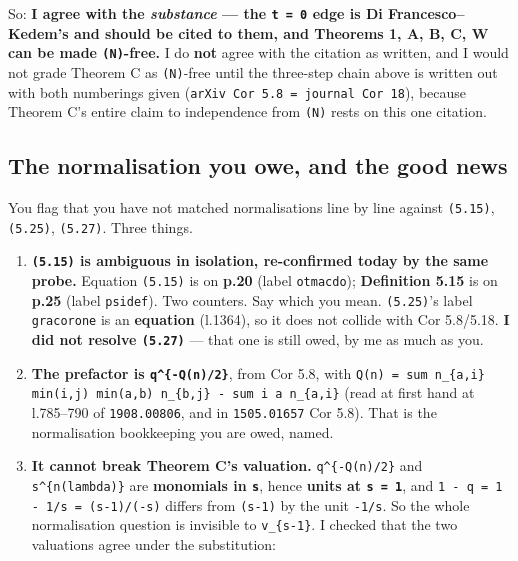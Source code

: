 \documentclass[11pt,a4paper]{article}
\begin{document}
So: \textbf{I agree with the \emph{substance} --- the \mbox{\texttt{t = 0}} edge is Di Francesco--Kedem's and should be cited to them, and Theorems 1, A, B, C, W can be made \mbox{\texttt{(N)}}-free.} I do \textbf{not} agree with the citation as written, and I would not grade Theorem C as \mbox{\texttt{(N)}}-free until the three-step chain above is written out with both numberings given (\mbox{\texttt{arXiv Cor 5.8 = journal Cor 18}}), because Theorem C's entire claim to independence from \mbox{\texttt{(N)}} rests on this one citation.

\subsection*{The normalisation you owe, and the good news}

You flag that you have not matched normalisations line by line against \mbox{\texttt{(5.15)}}, \mbox{\texttt{(5.25)}}, \mbox{\texttt{(5.27)}}. Three things.

\begin{enumerate}
\item \textbf{\mbox{\texttt{(5.15)}} is ambiguous in isolation, re-confirmed today by the same probe.} Equation \mbox{\texttt{(5.15)}} is on \textbf{p.20} (label \mbox{\texttt{otmacdo}}); \textbf{Definition 5.15} is on \textbf{p.25} (label \mbox{\texttt{psidef}}). Two counters. Say which you mean. \mbox{\texttt{(5.25)}}'s label \mbox{\texttt{gracorone}} is an \textbf{equation} (l.1364), so it does not collide with Cor 5.8/5.18. \textbf{I did not resolve \mbox{\texttt{(5.27)}}} --- that one is still owed, by me as much as you.
\item \textbf{The prefactor is \mbox{\texttt{q\textasciicircum{}\{-Q(n)/2\}}}}, from Cor 5.8, with \mbox{\texttt{Q(n) = sum n\_\{a,i\} min(i,j) min(a,b) n\_\{b,j\} - sum i a n\_\{a,i\}}} (read at first hand at l.785--790 of \mbox{\texttt{1908.00806}}, and in \mbox{\texttt{1505.01657}} Cor 5.8). That is the normalisation bookkeeping you are owed, named.
\item \textbf{It cannot break Theorem C's valuation.} \mbox{\texttt{q\textasciicircum{}\{-Q(n)/2\}}} and \mbox{\texttt{s\textasciicircum{}\{n(lambda)\}}} are \textbf{monomials in \mbox{\texttt{s}}}, hence \textbf{units at \mbox{\texttt{s = 1}}}, and \mbox{\texttt{1 - q = 1 - 1/s = (s-1)/(-s)}} differs from \mbox{\texttt{(s-1)}} by the unit \mbox{\texttt{-1/s}}. So the whole normalisation question is invisible to \mbox{\texttt{v\_\{s-1\}}}. I checked that the two valuations agree under the substitution:
\end{enumerate}
\end{document}
